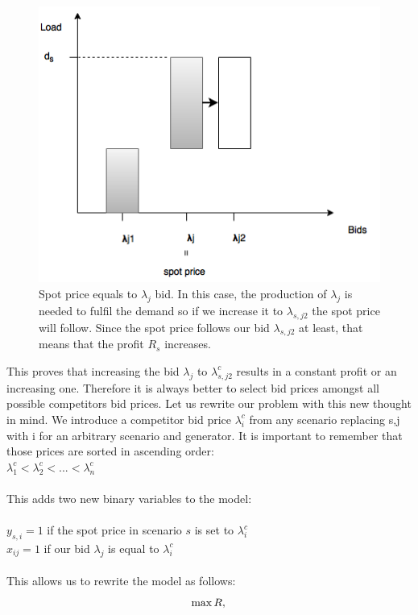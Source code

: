 \documentclass[letterpaper]{article}
\begin{document}
\begin{itemize}
\begin{figure}[H]
\includegraphics[scale=0.5]{../documentation/p1_c3.png}
\caption{Spot price equals to $\lambda_j$ bid. In this case, the production of $\lambda_j$ is needed to fulfil the demand so if we increase it to $\lambda_{s,j2}$ the spot price will follow. Since the spot price follows our bid $\lambda_{s,j2}$ at least, that means that the profit $R_s$ increases.}
\end{figure}
\end{itemize}
This proves that increasing the bid $\lambda_j$ to $\lambda_{s,j2}^c$ results in a constant profit or an increasing one. Therefore it is always better to select bid prices amongst all possible competitors bid prices.
Let us rewrite our problem with this new thought in mind. We introduce a competitor bid price $\lambda_i^c$ from any scenario replacing s,j with i for an arbitrary scenario and generator. It is important to remember that those prices are sorted in ascending order:\\
$\lambda_1^c < \lambda_2^c < ...< \lambda_n^c$\\ \\
This adds two new binary variables to the model: \\\\
$y_{s,i} = 1$ if the spot price in scenario $s$ is set to $\lambda_i^c$\\
$x_{ij} = 1$ if our bid $\lambda_j$ is equal to $\lambda_i^c$\\ \\
This allows us to rewrite the model as follows:\\
\begin{equation}
\max R, \\
\end{equation}
\end{document}
